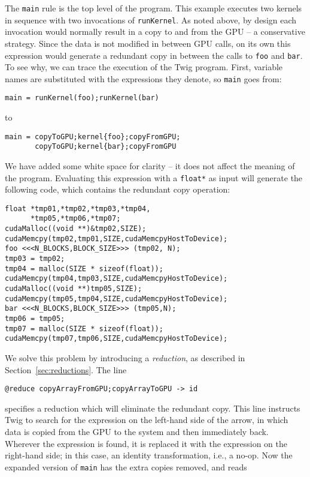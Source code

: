 The \texttt{main} rule is the top level of the program. This example executes
two kernels in sequence with two invocations of \texttt{runKernel}. As noted
above, by design each invocation would normally result in a copy to and from the
GPU -- a conservative strategy. Since the data is not modified in between GPU
calls, on its own this expression would generate a redundant copy in between the
calls to \texttt{foo} and \texttt{bar}. To see why, we can trace the execution
of the Twig program. First, variable names are substituted with the expressions
they denote, so \texttt{main} goes from:

\begin{verbatim}
main = runKernel(foo);runKernel(bar)
\end{verbatim}

to 

\begin{verbatim}
main = copyToGPU;kernel{foo};copyFromGPU;
       copyToGPU;kernel{bar};copyFromGPU
\end{verbatim}

We have added some white space for clarity -- it does not affect the meaning of
the program. Evaluating this expression with a \texttt{float*} as input will
generate the following code, which contains the redundant copy operation:

\begin{verbatim}
float *tmp01,*tmp02,*tmp03,*tmp04,
      *tmp05,*tmp06,*tmp07;
cudaMalloc((void **)&tmp02,SIZE);
cudaMemcpy(tmp02,tmp01,SIZE,cudaMemcpyHostToDevice);
foo <<<N_BLOCKS,BLOCK_SIZE>>> (tmp02, N);
tmp03 = tmp02;
tmp04 = malloc(SIZE * sizeof(float));
cudaMemcpy(tmp04,tmp03,SIZE,cudaMemcpyHostToDevice);
cudaMalloc((void **)tmp05,SIZE);
cudaMemcpy(tmp05,tmp04,SIZE,cudaMemcpyHostToDevice);
bar <<<N_BLOCKS,BLOCK_SIZE>>> (tmp05,N);
tmp06 = tmp05;
tmp07 = malloc(SIZE * sizeof(float));
cudaMemcpy(tmp07,tmp06,SIZE,cudaMemcpyHostToDevice);
\end{verbatim}

We solve this problem by introducing a \emph{reduction}, as described in
Section~\ref{sec:reductions}. The line

\begin{verbatim}
@reduce copyArrayFromGPU;copyArrayToGPU -> id
\end{verbatim}

specifies a reduction which will eliminate the redundant copy. This line
instructs Twig to search for the expression on the left-hand side of the arrow,
in which data is copied from the GPU to the system and then immediately back.
Wherever the expression is found, it is replaced it with the expression on the
right-hand side; in this case, an identity transformation, i.e., a no-op. Now
the expanded version of \texttt{main} has the extra copies removed, and reads

